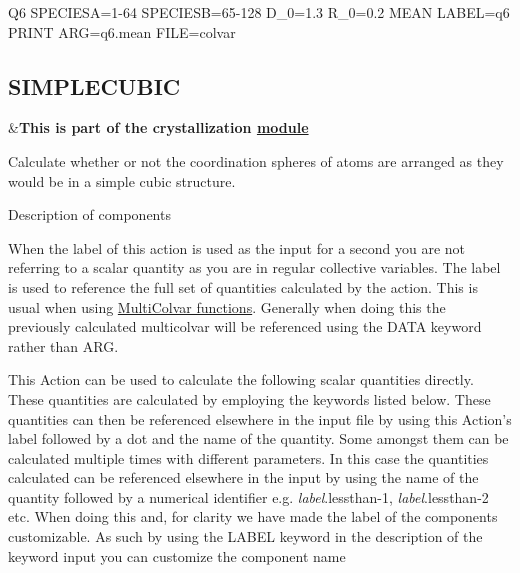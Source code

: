 \begin{DoxyVerb}Q6 SPECIESA=1-64 SPECIESB=65-128 D_0=1.3 R_0=0.2 MEAN LABEL=q6
PRINT ARG=q6.mean FILE=colvar
\end{DoxyVerb}
 \hypertarget{SIMPLECUBIC}{}\subsection{S\+I\+M\+P\+L\+E\+C\+U\+B\+I\+C}\label{SIMPLECUBIC}
\begin{TabularC}{2}
\hline
&{\bfseries  This is part of the crystallization \hyperlink{mymodules}{module }}   \\
\end{TabularC}
Calculate whether or not the coordination spheres of atoms are arranged as they would be in a simple cubic structure.

\begin{DoxyParagraph}{Description of components}

\end{DoxyParagraph}
When the label of this action is used as the input for a second you are not referring to a scalar quantity as you are in regular collective variables. The label is used to reference the full set of quantities calculated by the action. This is usual when using \hyperlink{mcolv_multicolvarfunction}{Multi\+Colvar functions}. Generally when doing this the previously calculated multicolvar will be referenced using the D\+A\+T\+A keyword rather than A\+R\+G.

This Action can be used to calculate the following scalar quantities directly. These quantities are calculated by employing the keywords listed below. These quantities can then be referenced elsewhere in the input file by using this Action's label followed by a dot and the name of the quantity. Some amongst them can be calculated multiple times with different parameters. In this case the quantities calculated can be referenced elsewhere in the input by using the name of the quantity followed by a numerical identifier e.\+g. {\itshape label}.lessthan-\/1, {\itshape label}.lessthan-\/2 etc. When doing this and, for clarity we have made the label of the components customizable. As such by using the L\+A\+B\+E\+L keyword in the description of the keyword input you can customize the component name

